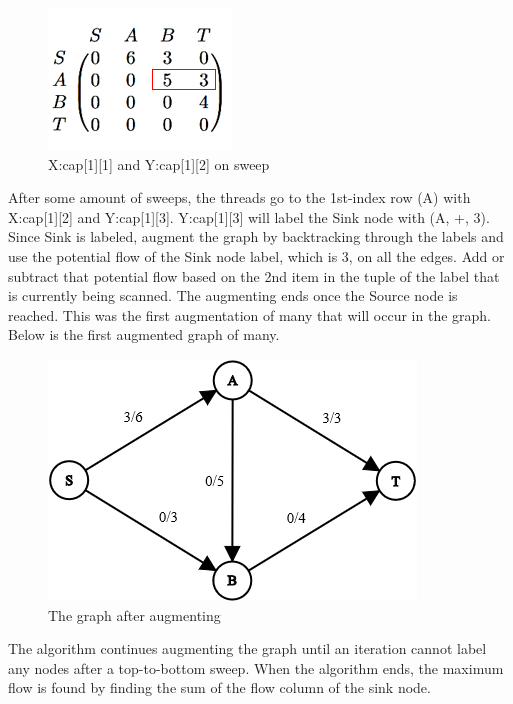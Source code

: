         \begin{figure}[H]
            \centering
            \includegraphics[scale=.7]{figures/cap[1][3].png}
            \caption{X:cap[1][1] and Y:cap[1][2] on sweep}
            \label{fig:Sweep}
        \end{figure}
        
        After some amount of sweeps, the threads go to the 1st-index row (A) with X:cap[1][2] and Y:cap[1][3]. Y:cap[1][3] will label the Sink node with (A, +, 3). Since Sink is labeled, augment the graph by backtracking through the labels and use the potential flow of the Sink node label, which is 3, on all the edges. Add or subtract that potential flow based on the 2nd item in the tuple of the label that is currently being scanned. The augmenting ends once the Source node is reached. This was the first augmentation of many that will occur in the graph. Below is the first augmented graph of many.
        
        \begin{figure}[H]
            \centering
            \includegraphics[scale=.7]{figures/FFaugmented.png}
            \caption{The graph after augmenting}
            \label{fig:Sweep}
        \end{figure}
        
        The algorithm continues augmenting the graph until an iteration cannot label any nodes after a top-to-bottom sweep. When the algorithm ends, the maximum flow is found by finding the sum of the flow column of the sink node.
        
